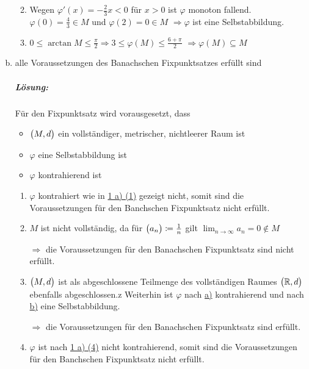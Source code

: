 \documentclass{scrreprt}
\begin{document}
\begin{enumerate}[a)]
\begin{enumerate}[(1)]
  \label{sec:1_b_3}
  \item Wegen $\varphi'(x) = -\frac{2}{3}x < 0$ für $x > 0$ ist $\varphi$ monoton fallend.
    $\varphi(0) = \frac{4}{3} \in M$ und $\varphi(2) = 0 \in M$
    $\Rightarrow \varphi$ ist eine Selbstabbildung.

  \item $0 \leq \arctan M \leq \frac{\pi}{2} \Rightarrow 3 \leq \varphi(M) \leq \frac{6 + \pi}{2}$
    $\Rightarrow \varphi(M) \subseteq M$
  \end{enumerate}

\newpage
\item alle Voraussetzungen des Banachschen Fixpunktsatzes erfüllt sind

  \subparagraph{Lösung:} Für den Fixpunktsatz wird vorausgesetzt, dass
  \begin{itemize}
  \item $\qty\big(M, d)$ ein vollständiger, metrischer, nichtleerer Raum ist
  \item $\varphi$ eine Selbstabbildung ist
  \item $\varphi$ kontrahierend ist
  \end{itemize}
  \begin{enumerate}[(1)]
  \item $\varphi$ kontrahiert wie in \hyperref[sec:1_a_1]{1 a) (1)} gezeigt nicht,
    somit sind die Voraussetzungen für den Banchschen Fixpunktsatz nicht erfüllt.

  \item $M$ ist nicht vollständig, da für $\qty\big(a_n) \coloneqq \frac{1}{n}$
    gilt $\lim_{n \to \infty} a_n = 0 \notin M$

    $\Rightarrow$ die Voraussetzungen für den Banachschen Fixpunktsatz sind nicht erfüllt.

  \item $\qty\big(M, d)$ ist als abgeschlossene Teilmenge des vollständigen Raumes
    $\qty\big(\mathbb{R}, d)$ ebenfalls abgeschlossen.z
    Weiterhin ist $\varphi$ nach \hyperref[sec:1_a_3]{a)} kontrahierend und nach
    \hyperref[sec:1_b_3]{b)} eine Selbstabbildung.

    $\Rightarrow$ die Voraussetzungen für den Banachschen Fixpunktsatz sind erfüllt.

  \item $\varphi$ ist nach \hyperref[sec:1_a_4]{1 a) (4)} nicht kontrahierend,
    somit sind die Voraussetzungen für den Banchschen Fixpunktsatz nicht erfüllt.
  \end{enumerate}
\end{enumerate}
\end{document}
